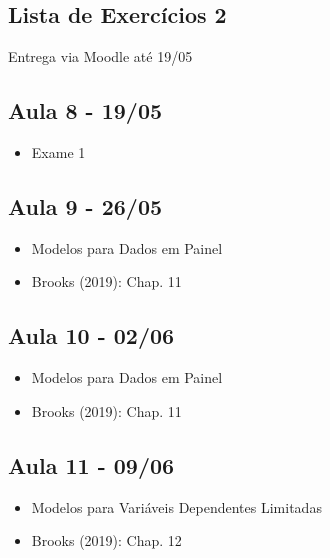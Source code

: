 \documentclass[11pt,]{article}
\providecommand{\tightlist}{%
  \setlength{\itemsep}{0pt}\setlength{\parskip}{0pt}}
\begin{document}
\hypertarget{lista-de-exercuxedcios-2}{%
\subsection{Lista de Exercícios 2}\label{lista-de-exercuxedcios-2}}

Entrega via Moodle até 19/05

\hypertarget{aula-8---1905}{%
\subsection{Aula 8 - 19/05}\label{aula-8---1905}}

\begin{itemize}
\tightlist
\item
  Exame 1
\end{itemize}

\hypertarget{aula-9---2605}{%
\subsection{Aula 9 - 26/05}\label{aula-9---2605}}

\begin{itemize}
\tightlist
\item
  Modelos para Dados em Painel
\item
  Brooks (2019): Chap. 11
\end{itemize}

\hypertarget{aula-10---0206}{%
\subsection{Aula 10 - 02/06}\label{aula-10---0206}}

\begin{itemize}
\tightlist
\item
  Modelos para Dados em Painel
\item
  Brooks (2019): Chap. 11
\end{itemize}

\hypertarget{aula-11---0906}{%
\subsection{Aula 11 - 09/06}\label{aula-11---0906}}

\begin{itemize}
\tightlist
\item
  Modelos para Variáveis Dependentes Limitadas
\item
  Brooks (2019): Chap. 12
\end{itemize}
\end{document}
